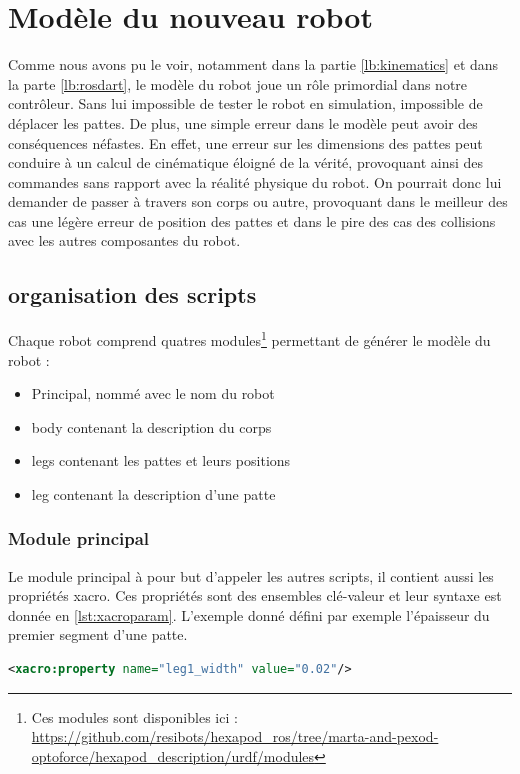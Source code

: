 \documentclass{tnreport}
\begin{document}
\section{Modèle du nouveau robot}\label{lb:xacro}
Comme nous avons pu le voir, notamment dans la partie \ref{lb:kinematics} et dans la parte \ref{lb:rosdart}, le modèle du robot joue un rôle primordial dans notre contrôleur. Sans lui impossible de tester le robot en simulation, impossible de déplacer les pattes. De plus, une simple erreur dans le modèle peut avoir des conséquences néfastes. En effet, une erreur sur les dimensions des pattes peut conduire à un calcul de cinématique éloigné de la vérité, provoquant ainsi des commandes sans rapport avec la réalité physique du robot. On pourrait donc lui demander de passer à travers son corps ou autre, provoquant dans le meilleur des cas une légère erreur de position des pattes et dans le pire des cas des collisions avec les autres composantes du robot. 
\subsection{organisation des scripts}
Chaque robot comprend quatres modules\footnote{Ces modules sont disponibles ici : \url{https://github.com/resibots/hexapod_ros/tree/marta-and-pexod-optoforce/hexapod_description/urdf/modules}} permettant de générer le modèle du robot :
\begin{itemize}
    \item Principal, nommé avec le nom du robot
    \item body contenant la description du corps
    \item legs contenant les pattes et leurs positions
    \item leg  contenant la description d'une patte
\end{itemize}

\subsubsection{Module principal}
Le module principal à pour but d'appeler les autres scripts, il contient aussi les propriétés xacro. Ces propriétés sont des ensembles clé-valeur et leur syntaxe est donnée en \ref{lst:xacroparam}. L'exemple donné défini par exemple l'épaisseur du premier segment d'une patte.

\begin{lstlisting}[language=XML,caption={Couple clé-valeur correspondant à un paramètre},label={lst:xacroparam}]
<xacro:property name="leg1_width" value="0.02"/>
\end{lstlisting}
\end{document}
